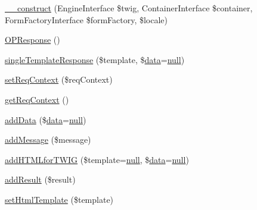 \begin{DoxyCompactItemize}
\item 
\hyperlink{class_acme_group_1_1_labo_bundle_1_1event_listeners_1_1session_data_1_1out_puts3_a1145cf19cfe2b90704b5c0af5004b8c7}{\+\_\+\+\_\+construct} (Engine\+Interface \$twig, Container\+Interface \$container, Form\+Factory\+Interface \$form\+Factory, \$locale)
\item 
\hyperlink{class_acme_group_1_1_labo_bundle_1_1event_listeners_1_1session_data_1_1out_puts3_ab4c08829a60d1d0ecd1b2fcb07ff098d}{O\+P\+Response} ()
\item 
\hyperlink{class_acme_group_1_1_labo_bundle_1_1event_listeners_1_1session_data_1_1out_puts3_a7bcf2027c7ea796476b61518f219ea00}{single\+Template\+Response} (\$template, \$\hyperlink{fullpage_2plugin_8js_a718c1bf5a3bf21ebb980203b142e5b75}{data}=\hyperlink{validate_8js_afb8e110345c45e74478894341ab6b28e}{null})
\item 
\hyperlink{class_acme_group_1_1_labo_bundle_1_1event_listeners_1_1session_data_1_1out_puts3_a3919eb6ac60b63b9178ece926ecb7e3c}{set\+Req\+Context} (\$req\+Context)
\item 
\hyperlink{class_acme_group_1_1_labo_bundle_1_1event_listeners_1_1session_data_1_1out_puts3_ada28ea0adef2d43db66024ff209655a2}{get\+Req\+Context} ()
\item 
\hyperlink{class_acme_group_1_1_labo_bundle_1_1event_listeners_1_1session_data_1_1out_puts3_a89a264e49858c45a76a512acdc5b2939}{add\+Data} (\$\hyperlink{fullpage_2plugin_8js_a718c1bf5a3bf21ebb980203b142e5b75}{data}=\hyperlink{validate_8js_afb8e110345c45e74478894341ab6b28e}{null})
\item 
\hyperlink{class_acme_group_1_1_labo_bundle_1_1event_listeners_1_1session_data_1_1out_puts3_ab56aa68c49c85e93c7895ff779947e24}{add\+Message} (\$message)
\item 
\hyperlink{class_acme_group_1_1_labo_bundle_1_1event_listeners_1_1session_data_1_1out_puts3_a8867f2f6257e41b998e39f8f1a539df5}{add\+H\+T\+M\+Lfor\+T\+W\+I\+G} (\$template=\hyperlink{validate_8js_afb8e110345c45e74478894341ab6b28e}{null}, \$\hyperlink{fullpage_2plugin_8js_a718c1bf5a3bf21ebb980203b142e5b75}{data}=\hyperlink{validate_8js_afb8e110345c45e74478894341ab6b28e}{null})
\item 
\hyperlink{class_acme_group_1_1_labo_bundle_1_1event_listeners_1_1session_data_1_1out_puts3_ad56375d2d1fe891dadc0044e10aeb33a}{add\+Result} (\$result)
\item 
\hyperlink{class_acme_group_1_1_labo_bundle_1_1event_listeners_1_1session_data_1_1out_puts3_ab656f818ed7f71b3d719750615a2ac18}{set\+Html\+Template} (\$template)

\end{DoxyCompactItemize}
